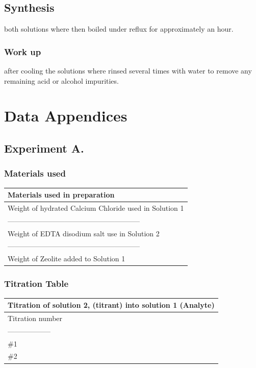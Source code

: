 \documentclass[]{article}
\begin{document}
\hypertarget{synthesis}{%
\subsection{Synthesis}\label{synthesis}}

both solutions where then boiled under reflux for approximately an hour.

\hypertarget{work-up}{%
\subsubsection{Work up}\label{work-up}}

after cooling the solutions where rinsed several times with water to
remove any remaining acid or alcohol impurities.

\hypertarget{data-appendices}{%
\section{Data Appendices}\label{data-appendices}}

\hypertarget{experiment-a.-1}{%
\subsection{Experiment A.}\label{experiment-a.-1}}

\hypertarget{materials-used}{%
\subsubsection{Materials used}\label{materials-used}}

\begin{longtable}[]{@{}l@{}}
\toprule
Materials used in preparation\tabularnewline
\midrule
\endhead
Weight of hydrated Calcium Chloride used in Solution 1\tabularnewline
--------------------------------------------------------\tabularnewline
Weight of EDTA disodium salt use in Solution 2\tabularnewline
--------------------------------------------------------\tabularnewline
Weight of Zeolite added to Solution 1\tabularnewline
\bottomrule
\end{longtable}

\hypertarget{titration-table}{%
\subsubsection{Titration Table}\label{titration-table}}

\begin{longtable}[]{@{}l@{}}
\toprule
Titration of solution 2, (titrant) into solution 1
(Analyte)\tabularnewline
\midrule
\endhead
Titration number\tabularnewline
------------------\tabularnewline
\#1\tabularnewline
\#2\tabularnewline
\bottomrule
\end{longtable}
\end{document}
